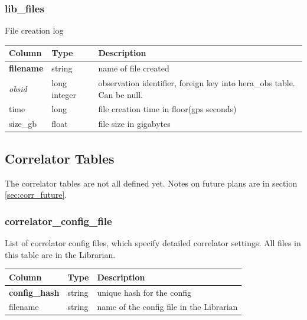 \documentclass{article}
\begin{document}
\subsubsection{lib\_files}
File creation log
\begin{center}
 \begin{tabular}{| p{4cm} | p{2cm} | p{10cm} |}
\hline
 {\bf Column} & {\bf Type}  & {\bf Description} \\ [0.5ex]  \hline\hline
\textbf{filename} & string & name of file created \\ \hline
\textit{obsid} & long integer & observation identifier, foreign key into hera\_obs table. Can be null. \\ \hline
time & long & file creation time in floor(gps seconds)\\ \hline
size\_gb & float & file size in gigabytes \\ \hline
\end{tabular}
\end{center}




\subsection{Correlator Tables}
The correlator tables are not all defined yet. Notes on future plans are in section \ref{sec:corr_future}.


\subsubsection{correlator\_config\_file}
List of correlator config files, which specify detailed correlator settings. All files in this table are in the Librarian.
\begin{center}
 \begin{tabular}{| p{4cm} | p{2cm} | p{10cm} |}
\hline
 {\bf Column} & {\bf Type}  & {\bf Description} \\ [0.5ex]  \hline\hline
\textbf{config\_hash} & string & unique hash for the config\\ \hline
filename & string & name of the config file in the Librarian \\\hline
\end{tabular}
\end{center}
\end{document}
